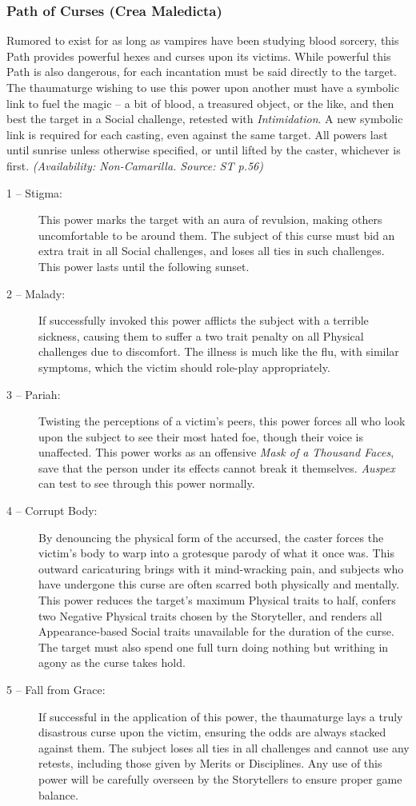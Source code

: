 \subsubsection{Path of Curses (Crea Maledicta)}
Rumored to exist for as long as vampires have been studying blood sorcery, this Path provides powerful 
hexes and curses upon its victims.  While powerful this Path is also dangerous, for each incantation 
must be said directly to the target.  The thaumaturge wishing to use this power upon another must have 
a symbolic link to fuel the magic -- a bit of blood, a treasured object, or the like, and then best 
the target in a Social challenge, retested with \emph{Intimidation}.  A new symbolic link is required 
for each casting, even against the same target.  All powers last until sunrise unless otherwise specified, 
or until lifted by the caster, whichever is first.  \emph{(Availability: Non-Camarilla.  Source: ST p.56)}

\begin{description}
	\item[1 -- Stigma:]  This power marks the target with an aura of revulsion, making others uncomfortable 
	to be around them.  The subject of this curse must bid an extra trait in all Social challenges, and loses 
	all ties in such challenges.  This power lasts until the following sunset.
	\item[2 -- Malady:]  If successfully invoked this power afflicts the subject with a terrible sickness, 
	causing them to suffer a two trait penalty on all Physical challenges due to discomfort.  The illness 
	is much like the flu, with similar symptoms, which the victim should role-play appropriately.
	\item[3 -- Pariah:]  Twisting the perceptions of a victim's peers, this power forces all who look upon the 
	subject to see their most hated foe, though their voice is unaffected.  This power works as an offensive 
	\emph{Mask of a Thousand Faces}, save that the person under its effects cannot break it themselves.  \emph{Auspex} 
	can test to see through this power normally.
	\item[4 -- Corrupt Body:]  By denouncing the physical form of the accursed, the caster forces the victim's 
	body to warp into a grotesque parody of what it once was.  This outward caricaturing brings with it mind-wracking 
	pain, and subjects who have undergone this curse are often scarred both physically and mentally.  This power 
	reduces the target's maximum Physical traits to half, confers two Negative Physical traits chosen by the 
	Storyteller, and renders all Appearance-based Social traits unavailable for the duration of the curse.  The 
	target must also spend one full turn doing nothing but writhing in agony as the curse takes hold.
	\item[5 -- Fall from Grace:]  If successful in the application of this power, the thaumaturge lays a truly 
	disastrous curse upon the victim, ensuring the odds are always stacked against them.  The subject loses all 
	ties in all challenges and cannot use any retests, including those given by Merits or Disciplines.  Any use 
	of this power will be carefully overseen by the Storytellers to ensure proper game balance.
\end{description}

